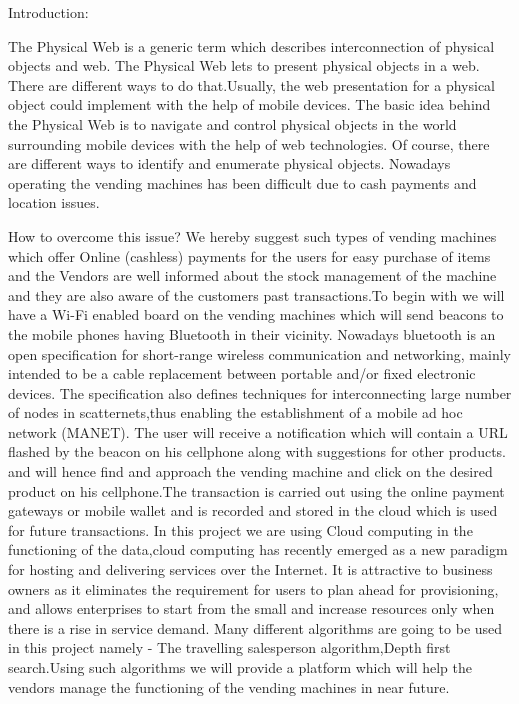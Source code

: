 \documentclass[oneside,a4paper,12pt]{report}
\begin{document}
Introduction:

 The Physical Web is a generic term which describes interconnection of physical objects and web. The Physical Web lets to present physical objects in a web. There are different ways to do that.Usually, the web presentation for a physical object could implement with the help
of mobile devices. The basic idea behind the Physical Web is to navigate and control physical objects in the world surrounding
mobile devices with the help of web technologies. Of course, there are different ways to identify and enumerate physical objects.
Nowadays operating the vending machines has been difficult due to cash payments and location issues.

How to overcome this issue?
 We hereby suggest such types of vending machines which offer Online (cashless) payments for the users for easy purchase of items and the Vendors are well informed about the stock management of the machine and they are also aware of the customers past transactions.To begin with we will have a Wi-Fi enabled board on the vending machines which will send beacons to the mobile phones having Bluetooth in their vicinity.
Nowadays bluetooth is an open specification for short-range wireless communication and networking, mainly intended to be a cable replacement between portable and/or fixed electronic devices. The specification also defines techniques for interconnecting large number of nodes in scatternets,thus enabling the establishment of a mobile ad hoc network (MANET).
The user will receive a notification which will contain a URL flashed by the beacon on his cellphone along with suggestions for other products.
and will hence find and approach the vending machine and click on the desired product on his cellphone.The transaction is carried out using the online payment gateways or mobile wallet and is recorded and stored in the cloud which is used for future transactions.
In this project we are using Cloud computing in the functioning of the data,cloud computing has recently emerged as a new
paradigm for hosting and delivering services over the Internet. It is attractive to business owners as it eliminates the requirement for users to plan ahead for provisioning, and allows enterprises to start from the small and increase resources only when there is a rise in service demand.
Many different algorithms are going to be used in this project namely - The travelling salesperson algorithm,Depth first search.Using such algorithms we will provide a platform which will help the vendors manage the functioning of the vending machines in near future.
\end{document}
